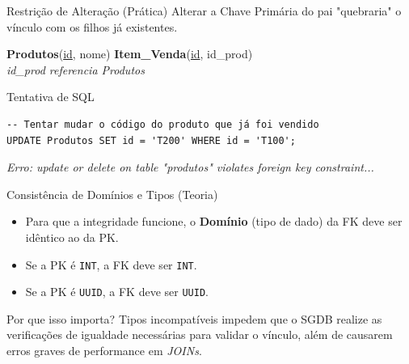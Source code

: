 \documentclass[9pt]{beamer}
\begin{document}
\begin{frame}[fragile]{Restrição de Alteração (Prática)}
  \small
  Alterar a Chave Primária do pai "quebraria" o vínculo com os filhos já existentes.
  \vspace{0.3cm}
  \centering
  \centering\scriptsize
  \textbf{Produtos}(\underline{id}, nome) \quad \textbf{Item\_Venda}(\underline{id}, \color{red}id\_prod\color{black}) \\
  \textit{id\_prod referencia Produtos}
  \vspace{0.2cm}
  \begin{exampleblock}{Tentativa de SQL}
\begin{lstlisting}
-- Tentar mudar o código do produto que já foi vendido
UPDATE Produtos SET id = 'T200' WHERE id = 'T100';
\end{lstlisting}
    \vspace{0.1cm}
    \color{red}\textit{Erro: update or delete on table "produtos" violates foreign key constraint...}
  \end{exampleblock}
\end{frame}

\begin{frame}{Consistência de Domínios e Tipos (Teoria)}
  \begin{itemize}
    \item Para que a integridade funcione, o \textbf{Domínio} (tipo de dado) da FK deve ser idêntico ao da PK.
    \item Se a PK é \texttt{INT}, a FK deve ser \texttt{INT}.
    \item Se a PK é \texttt{UUID}, a FK deve ser \texttt{UUID}.
  \end{itemize}
  \vspace{0.4cm}
  \begin{block}{Por que isso importa?}
    Tipos incompatíveis impedem que o SGDB realize as verificações de igualdade necessárias para validar o vínculo, além de causarem erros graves de performance em \textit{JOINs}.
  \end{block}
\end{frame}
\end{document}
